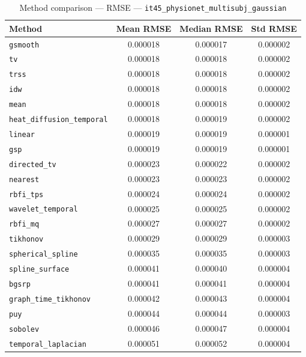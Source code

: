 \begin{table}[ht]
\centering
\caption{Method comparison — RMSE — \texttt{it45_physionet_multisubj_gaussian}}
\label{tab:rmse_it45_physionet_multisubj_gaussian}
\begin{tabular}{lccc}
\hline
Method & Mean RMSE & Median RMSE & Std RMSE \\
\hline
\texttt{gsmooth} & 0.000018 & 0.000017 & 0.000002 \\
\texttt{tv} & 0.000018 & 0.000018 & 0.000002 \\
\texttt{trss} & 0.000018 & 0.000018 & 0.000002 \\
\texttt{idw} & 0.000018 & 0.000018 & 0.000002 \\
\texttt{mean} & 0.000018 & 0.000018 & 0.000002 \\
\texttt{heat_diffusion_temporal} & 0.000018 & 0.000019 & 0.000002 \\
\texttt{linear} & 0.000019 & 0.000019 & 0.000001 \\
\texttt{gsp} & 0.000019 & 0.000019 & 0.000001 \\
\texttt{directed_tv} & 0.000023 & 0.000022 & 0.000002 \\
\texttt{nearest} & 0.000023 & 0.000023 & 0.000002 \\
\texttt{rbfi_tps} & 0.000024 & 0.000024 & 0.000002 \\
\texttt{wavelet_temporal} & 0.000025 & 0.000025 & 0.000002 \\
\texttt{rbfi_mq} & 0.000027 & 0.000027 & 0.000002 \\
\texttt{tikhonov} & 0.000029 & 0.000029 & 0.000003 \\
\texttt{spherical_spline} & 0.000035 & 0.000035 & 0.000003 \\
\texttt{spline_surface} & 0.000041 & 0.000040 & 0.000004 \\
\texttt{bgsrp} & 0.000041 & 0.000041 & 0.000004 \\
\texttt{graph_time_tikhonov} & 0.000042 & 0.000043 & 0.000004 \\
\texttt{puy} & 0.000044 & 0.000044 & 0.000003 \\
\texttt{sobolev} & 0.000046 & 0.000047 & 0.000004 \\
\texttt{temporal_laplacian} & 0.000051 & 0.000052 & 0.000004 \\
\hline
\end{tabular}
\end{table}
